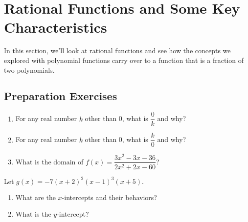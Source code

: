 

\section{Rational Functions and Some Key Characteristics} \label{functions-rational-short-term}

In this section, we'll look at rational functions and see how the concepts we explored with polynomial functions carry over to a function that is a fraction of two polynomials.   \\[0.5em]


\subsection*{Preparation Exercises} \label{prep-functions-rational-short-term}

\begin{myPrep}
	\begin{enumerate}
		\item For any real number $k$ other than 0, what is $\dfrac{0}{k}$ and why?
		\vfill
		\item For any real number $k$ other than 0, what is $\dfrac{k}{0}$ and why?
		\vfill
		\item What is the domain of $f(x) = \dfrac{3x^2-3x-36}{2x^2+2x-60}$?
		\vfill
	\end{enumerate}
\end{myPrep}

\begin{myPrep}
	Let $g(x) =-7(x+2)^2(x-1)^3(x+5)$. 
	\begin{enumerate}
		\item What are the $x$-intercepts and their behaviors?
		\vfill
		\vfill
		\item What is the $y$-intercept?
		\vfill
	\end{enumerate}
\end{myPrep}


